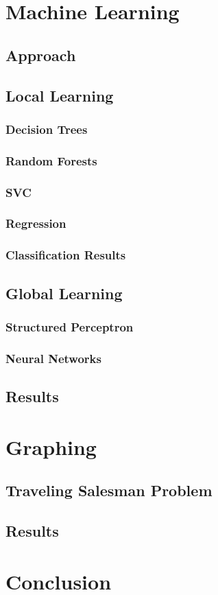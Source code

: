 \documentclass[12pt]{report}
\begin{document}
\chapter{Machine Learning}

\section{Approach}

\section{Local Learning}
\subsection{Decision Trees}
\subsection{Random Forests}
\subsection{SVC}
\subsection{Regression}
\subsection{Classification Results}

\section{Global Learning}
\subsection{Structured Perceptron}
\subsection{Neural Networks}

\section{Results}

\chapter{Graphing}
\section{Traveling Salesman Problem}

\section{Results}

\chapter{Conclusion}



\end{document}
